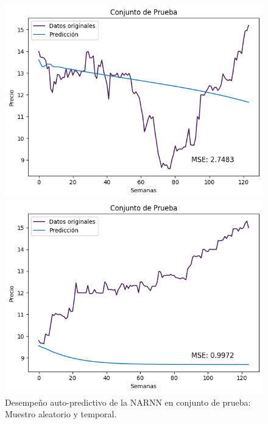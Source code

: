 \begin{figure}[H]
    \begin{minipage}{0.5\textwidth}
        \centering
        \includegraphics[width=\linewidth]{Figuras/proceso_de_entrenamiento/grafs_c_prueba/muestreo_aleatorio/NARNN/auto_predictiva/NARNN.png}
    \end{minipage}
    \begin{minipage}{0.5\textwidth}
        \centering
        \includegraphics[width=\linewidth]{Figuras/proceso_de_entrenamiento/grafs_c_prueba/NARNN/auto_predictiva/NARNN.png}
    \end{minipage}
    \caption{Desempeño auto-predictivo de la NARNN en conjunto de prueba: Muestro aleatorio y temporal.} 
    \label{fig:c_prueba_NARNN_autopred_1}
\end{figure}

